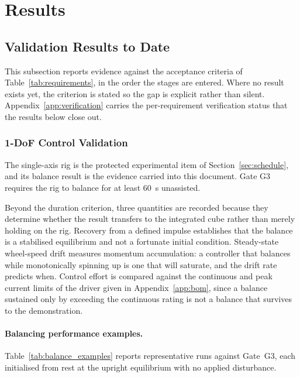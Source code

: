 \section{Results}
\subsection{Validation Results to Date}
\label{sec:validation_results}

This subsection reports evidence against the acceptance criteria of
Table~\ref{tab:requirements}, in the order the stages are entered. Where no
result exists yet, the criterion is stated so the gap is explicit rather than
silent. Appendix~\ref{app:verification} carries the per-requirement
verification status that the results below close out.

\subsubsection{1-DoF Control Validation}
\label{sec:test_1dof}

The single-axis rig is the protected experimental item of
Section~\ref{sec:schedule}, and its balance result is the evidence carried into
this document. Gate G3 requires the rig to balance for at least 60~s unassisted.

Beyond the duration criterion, three quantities are recorded because they
determine whether the result transfers to the integrated cube rather than merely
holding on the rig. Recovery from a defined impulse establishes that the balance
is a stabilised equilibrium and not a fortunate initial condition. Steady-state
wheel-speed drift measures momentum accumulation: a controller that balances
while monotonically spinning up is one that will saturate, and the drift rate
predicts when. Control effort is compared against the continuous and peak current
limits of the driver given in Appendix~\ref{app:bom}, since a balance sustained
only by exceeding the continuous rating is not a balance that survives to the
demonstration.

\paragraph{Balancing performance examples.} Table~\ref{tab:balance_examples}
reports representative runs against Gate~G3, each initialised from rest at the
upright equilibrium with no applied disturbance.


